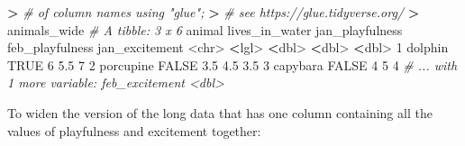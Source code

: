 \documentclass[
]{book}
\newenvironment{Shaded}{\begin{snugshade}}{\end{snugshade}}
\newcommand{\CommentTok}[1]{\textcolor[rgb]{0.56,0.35,0.01}{\textit{#1}}}
\newcommand{\ConstantTok}[1]{\textcolor[rgb]{0.00,0.00,0.00}{#1}}
\newcommand{\DecValTok}[1]{\textcolor[rgb]{0.00,0.00,0.81}{#1}}
\newcommand{\ErrorTok}[1]{\textcolor[rgb]{0.64,0.00,0.00}{\textbf{#1}}}
\newcommand{\FloatTok}[1]{\textcolor[rgb]{0.00,0.00,0.81}{#1}}
\newcommand{\NormalTok}[1]{#1}
\newcommand{\SpecialCharTok}[1]{\textcolor[rgb]{0.00,0.00,0.00}{#1}}
\begin{document}
\begin{Shaded}
\begin{Highlighting}[]
\ErrorTok{\textgreater{}}                             \CommentTok{\# of column names using "glue";}
\ErrorTok{\textgreater{}}                             \CommentTok{\# see https://glue.tidyverse.org/}
\ErrorTok{\textgreater{}}\NormalTok{ animals\_wide}
\CommentTok{\# A tibble: 3 x 6}
\NormalTok{  animal    lives\_in\_water jan\_playfulness feb\_playfulness jan\_excitement}
  \SpecialCharTok{\textless{}}\NormalTok{chr}\SpecialCharTok{\textgreater{}}     \ErrorTok{\textless{}}\NormalTok{lgl}\SpecialCharTok{\textgreater{}}                    \ErrorTok{\textless{}}\NormalTok{dbl}\SpecialCharTok{\textgreater{}}           \ErrorTok{\textless{}}\NormalTok{dbl}\SpecialCharTok{\textgreater{}}          \ErrorTok{\textless{}}\NormalTok{dbl}\SpecialCharTok{\textgreater{}}
\DecValTok{1}\NormalTok{ dolphin   }\ConstantTok{TRUE}                       \DecValTok{6}               \FloatTok{5.5}            \DecValTok{7}  
\DecValTok{2}\NormalTok{ porcupine }\ConstantTok{FALSE}                      \FloatTok{3.5}             \FloatTok{4.5}            \FloatTok{3.5}
\DecValTok{3}\NormalTok{ capybara  }\ConstantTok{FALSE}                      \DecValTok{4}               \DecValTok{5}              \DecValTok{4}  
\CommentTok{\# ... with 1 more variable: feb\_excitement \textless{}dbl\textgreater{}}
\end{Highlighting}
\end{Shaded}

To widen the version of the long data that has one column containing all the values of playfulness and excitement together:
\end{document}
